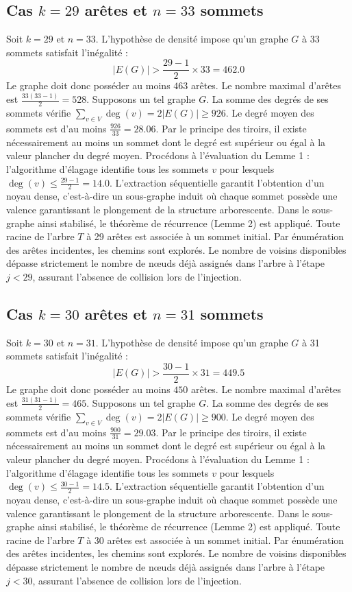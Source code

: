 \documentclass[12pt,a4paper]{article}
\begin{document}
\subsection{Cas $k = 29$ arêtes et $n = 33$ sommets}
Soit $k = 29$ et $n = 33$. L'hypothèse de densité impose qu'un graphe $G$ à 33 sommets satisfait l'inégalité :
$$ |E(G)| > \frac{29-1}{2} \times 33 = 462.0 $$
Le graphe doit donc posséder au moins $463$ arêtes. Le nombre maximal d'arêtes est $\frac{33(33-1)}{2} = 528$.
Supposons un tel graphe $G$. La somme des degrés de ses sommets vérifie $\sum_{v \in V} \deg(v) = 2|E(G)| \geq 926$.
Le degré moyen des sommets est d'au moins $\frac{926}{33} = 28.06$.
Par le principe des tiroirs, il existe nécessairement au moins un sommet dont le degré est supérieur ou égal à la valeur plancher du degré moyen.
Procédons à l'évaluation du Lemme 1 : l'algorithme d'élagage identifie tous les sommets $v$ pour lesquels $\deg(v) \leq \frac{29-1}{2} = 14.0$.
L'extraction séquentielle garantit l'obtention d'un noyau dense, c'est-à-dire un sous-graphe induit où chaque sommet possède une valence garantissant le plongement de la structure arborescente.
Dans le sous-graphe ainsi stabilisé, le théorème de récurrence (Lemme 2) est appliqué. Toute racine de l'arbre $T$ à 29 arêtes est associée à un sommet initial. Par énumération des arêtes incidentes, les chemins sont explorés. Le nombre de voisins disponibles dépasse strictement le nombre de nœuds déjà assignés dans l'arbre à l'étape $j < 29$, assurant l'absence de collision lors de l'injection.

\subsection{Cas $k = 30$ arêtes et $n = 31$ sommets}
Soit $k = 30$ et $n = 31$. L'hypothèse de densité impose qu'un graphe $G$ à 31 sommets satisfait l'inégalité :
$$ |E(G)| > \frac{30-1}{2} \times 31 = 449.5 $$
Le graphe doit donc posséder au moins $450$ arêtes. Le nombre maximal d'arêtes est $\frac{31(31-1)}{2} = 465$.
Supposons un tel graphe $G$. La somme des degrés de ses sommets vérifie $\sum_{v \in V} \deg(v) = 2|E(G)| \geq 900$.
Le degré moyen des sommets est d'au moins $\frac{900}{31} = 29.03$.
Par le principe des tiroirs, il existe nécessairement au moins un sommet dont le degré est supérieur ou égal à la valeur plancher du degré moyen.
Procédons à l'évaluation du Lemme 1 : l'algorithme d'élagage identifie tous les sommets $v$ pour lesquels $\deg(v) \leq \frac{30-1}{2} = 14.5$.
L'extraction séquentielle garantit l'obtention d'un noyau dense, c'est-à-dire un sous-graphe induit où chaque sommet possède une valence garantissant le plongement de la structure arborescente.
Dans le sous-graphe ainsi stabilisé, le théorème de récurrence (Lemme 2) est appliqué. Toute racine de l'arbre $T$ à 30 arêtes est associée à un sommet initial. Par énumération des arêtes incidentes, les chemins sont explorés. Le nombre de voisins disponibles dépasse strictement le nombre de nœuds déjà assignés dans l'arbre à l'étape $j < 30$, assurant l'absence de collision lors de l'injection.
\end{document}
